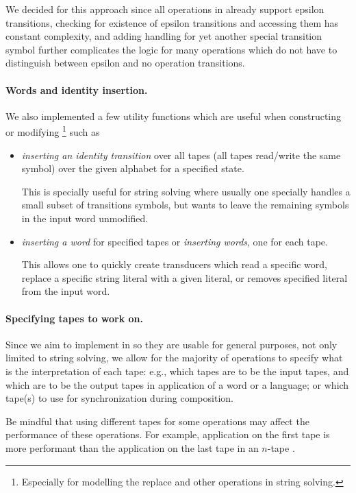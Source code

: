 We decided for this approach since all operations in \mata already support epsilon transitions, checking for existence of epsilon transitions and accessing them has constant complexity, and adding handling for yet another special transition symbol further complicates the logic for many operations which do not have to distinguish between epsilon and no operation transitions.

\paragraph{Words and identity insertion.}
We also implemented a few utility functions which are useful when constructing or modifying \nfts\footnote{Especially for modelling the replace and other operations in string solving.} such as
\begin{itemize}
  \item \emph{inserting an identity transition} over all tapes (all tapes read/write the same symbol) over the given alphabet for a specified state.

  This is specially useful for string solving where usually one specially handles a small subset of transitions symbols, but wants to leave the remaining symbols in the input word unmodified.

  \item \emph{inserting a word} for specified tapes or \emph{inserting words}, one for each tape.

  This allows one to quickly create transducers which read a specific word, replace a specific string literal with a given literal, or removes specified literal from the input word.
\end{itemize}

\paragraph{Specifying tapes to work on.}
Since we aim to implement \nfts in \mata so they are usable for general purposes, not only limited to string solving, we allow for the majority of operations to specify what is the interpretation of each tape: e.g., which tapes are to be the input tapes, and which are to be the output tapes in application of a word or a language; or which tape(s) to use for synchronization during composition.

Be mindful that using different tapes for some operations may affect the performance of these operations. For example, application on the first tape is more performant than the application on the last tape in an $n$-tape \nft.

